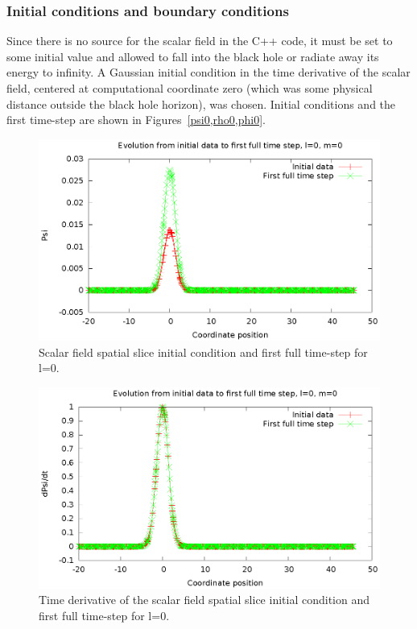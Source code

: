 \subsubsection{Initial conditions and boundary conditions}
Since there is no source for the scalar field in the C++ code, it must be set to some initial value and allowed to fall into the black hole or radiate away its energy to infinity. A Gaussian initial condition in the time derivative of the scalar field, centered at computational coordinate zero (which was some physical distance outside the black hole horizon), was chosen. Initial conditions and the first time-step are shown in Figures~\ref{psi0,rho0,phi0}.


\begin{figure}
  \includegraphics{psi1dl0}
  \caption{Scalar field spatial slice initial condition and first full time-step for l=0.}
\end{figure}

\begin{figure}
  \includegraphics{rho1dl0}
  \caption{Time derivative of the scalar field spatial slice initial condition and first full time-step for l=0.}
\end{figure}

